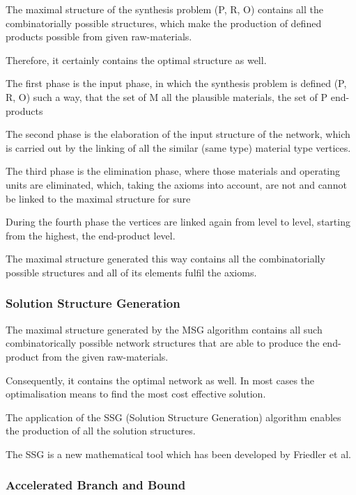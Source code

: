 The maximal structure of the synthesis problem (P, R, O) 
contains all the combinatorially possible structures,
which make the production of defined products possible 
from given raw-materials. \cite{pns2}\cite{algo}
 
Therefore, it certainly contains the optimal structure as well.

The first phase is the input phase, in which the synthesis problem 
is defined (P, R, O) such a way, that the set of M all the plausible materials, 
the set of P end-products 

The second phase is the elaboration of the input structure of the network, 
which is carried out by the linking of all the similar (same type) material type vertices.

The third phase is the elimination phase, where those materials 
and operating units are eliminated, which, taking the  axioms into account,
are not and cannot be linked to the maximal structure for sure

During the fourth phase the vertices are linked again from level to level, 
starting from the highest, the end-product level.

The maximal structure generated this way contains all the combinatorially possible 
structures and all of its elements fulfil the  axioms.\cite{pns2}\cite{algo}

\subsubsection{Solution Structure Generation}

The maximal structure generated by the MSG algorithm contains all such combinatorically 
possible network structures that are able to produce the end-product from the given raw-materials.\cite{pns2}\cite{algo}

Consequently, it contains the optimal network as well. 
In most cases the optimalisation means  to find the most cost effective solution.

The application of the SSG (Solution Structure Generation) algorithm 
enables the production of all the solution structures. 

The SSG is a new mathematical tool  which has been developed by Friedler et al.\cite{pns2}\cite{algo}

\subsubsection{Accelerated Branch and Bound}

